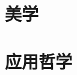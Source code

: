 \documentclass[UTF8]{RepresentationUniverse}
\begin{document}
\section{美学}
\section{应用哲学}
\end{document}
